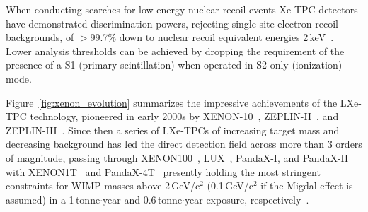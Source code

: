 When conducting searches for low energy nuclear recoil events Xe TPC detectors have demonstrated discrimination powers, rejecting single-site electron recoil backgrounds, of $>$99.7\% down to nuclear recoil equivalent energies 2\,keV~\cite{LUX:2020car}. Lower analysis thresholds can be achieved by dropping the requirement of the presence of a S1 (primary scintillation) when operated in S2-only (ionization) mode.

Figure~\ref{fig:xenon_evolution} summarizes the impressive achievements of the LXe-TPC technology, pioneered in early 2000s by XENON-10~\cite{XENON10:2007prx}, ZEPLIN-II~\cite{ALNER2007287}, and ZEPLIN-III~\cite{Akimov:2011tj}. Since then a series of LXe-TPCs of increasing target mass and decreasing background has led the direct detection field across more than 3 orders of magnitude, passing through XENON100~\cite{APRILE2012573}, LUX~\cite{AKERIB2013111}, PandaX-I, and PandaX-II~\cite{pandax} with  XENON1T~\cite{xenon1t,XENON:2018voc} and PandaX-4T~\cite{PandaX-4T:2021bab} presently holding the most stringent constraints for WIMP masses above 2\,GeV/c$^2$ (0.1\,GeV/c$^2$ if the Migdal effect is assumed) in a 1\,tonne$\cdot$year and 0.6\,tonne$\cdot$year exposure, respectively~\cite{PhysRevLett.123.251801, PhysRevLett.123.241803,PandaX-4T:2021bab}.


